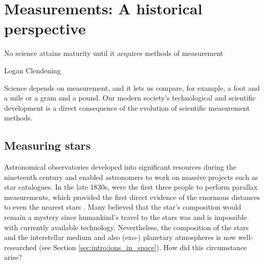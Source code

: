 \section{Measurements: A historical perspective}
\label{sec:intro:measurements}

\epigraph{No science attains maturity until it acquires methods of measurement}{Logan Clendening}

Science depends on measurement, and it lets us compare, for example, a foot and a mile or a gram and a pound. Our modern society's technological and scientific development is a direct consequence of the evolution of scientific measurement methods.

\subsection{Measuring stars}
\dropcap A{stronomical} observatories developed into significant resources during the nineteenth century and enabled astronomers to work on massive projects such as star catalogues. In the late 1830s, \citet{bessel_parallax_1838, henderson_parallax_1840, struve_stellarum_1837} were the first three people to perform parallax measurements, which provided the first direct evidence of the enormous distances to even the nearest stars \cite{reid_first_2020}. Many believed that the star's composition would remain a mystery since humankind's travel to the stars was and is impossible with currently available technology. Nevertheless, the composition of the stars and the interstellar medium and also (exo-) planetary atmospheres is now well-researched (see Section \ref{sec:intro:ions_in_space}). How did this circumstance arise?

